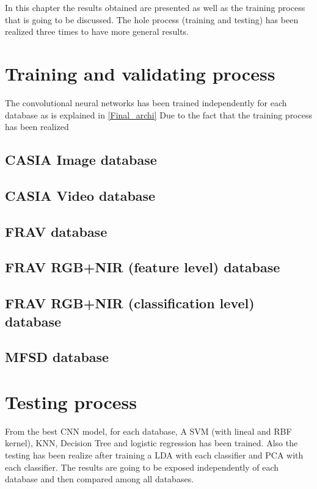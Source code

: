 
In this chapter the results obtained are presented as well as the training process that is going to be discussed. The hole process (training and testing) has been realized three times to have more general results.


\section{Training and validating process}
The convolutional neural networks has been trained independently for each database as is explained in \ref{Final_archi}  Due to the fact that the training process has been realized 

\subsection{CASIA Image database}

\subsection{CASIA Video database}

\subsection{FRAV database}

\subsection{FRAV RGB+NIR (feature level) database}

\subsection{FRAV RGB+NIR (classification level) database}

\subsection{MFSD database}


\section{Testing process}
From the best CNN model, for each database, A SVM (with lineal and RBF kernel), KNN, Decision Tree and logistic regression has been trained. Also the testing has been realize after training a LDA with each classifier and PCA with each classifier. The results are going to be exposed independently of each database and then compared among all databases.\\

